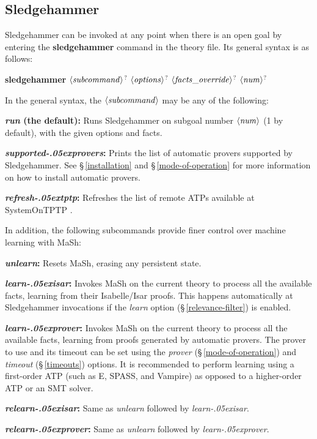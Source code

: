 \documentclass[a4paper,12pt]{article}
\let\oldS=\S
\def\S{\oldS\,}
\def\qty#1{\ensuremath{\left<\mathit{#1\/}\right>}}
\renewcommand\_{\hbox{\textunderscore\kern-.05ex}}
\begin{document}
\subsection{Sledgehammer}
\label{sledgehammer}

Sledgehammer can be invoked at any point when there is an open goal by entering
the \textbf{sledgehammer} command in the theory file. Its general syntax is as
follows:

\prew
\textbf{sledgehammer} \qty{subcommand}$^?$ \qty{options}$^?$ \qty{facts\_override}$^?$ \qty{num}$^?$
\postw

In the general syntax, the \qty{subcommand} may be any of the following:

\begin{enum}
\item[\labelitemi] \textbf{\textit{run} (the default):} Runs Sledgehammer on
subgoal number \qty{num} (1 by default), with the given options and facts.

\item[\labelitemi] \textbf{\textit{supported\_provers}:} Prints the list of
automatic provers supported by Sledgehammer. See \S\ref{installation} and
\S\ref{mode-of-operation} for more information on how to install automatic
provers.

\item[\labelitemi] \textbf{\textit{refresh\_tptp}:} Refreshes the list of remote
ATPs available at System\-On\-TPTP \cite{sutcliffe-2000}.
\end{enum}

In addition, the following subcommands provide finer control over machine
learning with MaSh:

\begin{enum}
\item[\labelitemi] \textbf{\textit{unlearn}:} Resets MaSh, erasing any
persistent state.

\item[\labelitemi] \textbf{\textit{learn\_isar}:} Invokes MaSh on the current
theory to process all the available facts, learning from their Isabelle/Isar
proofs. This happens automatically at Sledgehammer invocations if the
\textit{learn} option (\S\ref{relevance-filter}) is enabled.

\item[\labelitemi] \textbf{\textit{learn\_prover}:} Invokes MaSh on the current
theory to process all the available facts, learning from proofs generated by
automatic provers. The prover to use and its timeout can be set using the
\textit{prover} (\S\ref{mode-of-operation}) and \textit{timeout}
(\S\ref{timeouts}) options. It is recommended to perform learning using a
first-order ATP (such as E, SPASS, and Vampire) as opposed to a
higher-order ATP or an SMT solver.

\item[\labelitemi] \textbf{\textit{relearn\_isar}:} Same as \textit{unlearn}
followed by \textit{learn\_isar}.

\item[\labelitemi] \textbf{\textit{relearn\_prover}:} Same as \textit{unlearn}
followed by \textit{learn\_prover}.
\end{enum}
\end{document}
